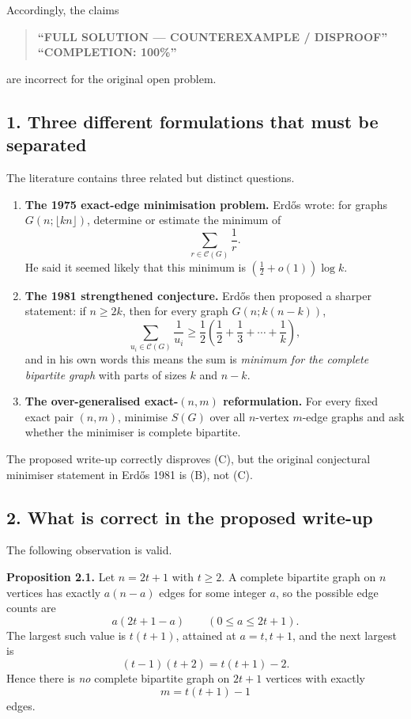 Accordingly, the claims
\begin{quote}
\textbf{``FULL SOLUTION --- COUNTEREXAMPLE / DISPROOF''}
\qquad{}\qquad
\textbf{``COMPLETION: 100\%''}
\end{quote}
are incorrect for the original open problem.

\subsection*{1. Three different formulations that must be separated}

The literature contains three related but distinct questions.

\begin{enumerate}
\item[(A)] \textbf{The 1975 exact-edge minimisation problem.}
Erd\H{o}s wrote: for graphs $G(n;\lfloor kn\rfloor)$, determine or estimate the minimum of
\[
\sum_{r\in \mathcal C(G)} \frac1r.
\]
He said it seemed likely that this minimum is $(\tfrac12+o(1))\log k$.

\item[(B)] \textbf{The 1981 strengthened conjecture.}
Erd\H{o}s then proposed a sharper statement: if $n\ge 2k$, then for every graph $G(n;k(n-k))$,
\[
\sum_{u_i\in \mathcal C(G)} \frac1{u_i}
\ge \frac12\left(\frac12+\frac13+\cdots+\frac1k\right),
\]
and in his own words this means the sum is \emph{minimum for the complete bipartite graph} with parts of sizes $k$ and $n-k$.

\item[(C)] \textbf{The over-generalised exact-$(n,m)$ reformulation.}
For every fixed exact pair $(n,m)$, minimise $S(G)$ over all $n$-vertex $m$-edge graphs and ask whether the minimiser is complete bipartite.
\end{enumerate}

The proposed write-up correctly disproves (C), but the original conjectural minimiser statement in Erd\H{o}s 1981 is (B), not (C).

\subsection*{2. What is correct in the proposed write-up}

The following observation is valid.

\textbf{Proposition 2.1.}
Let $n=2t+1$ with $t\ge 2$. A complete bipartite graph on $n$ vertices has exactly $a(n-a)$ edges for some integer $a$, so the possible edge counts are
\[
a(2t+1-a)\qquad(0\le a\le 2t+1).
\]
The largest such value is $t(t+1)$, attained at $a=t,t+1$, and the next largest is
\[
(t-1)(t+2)=t(t+1)-2.
\]
Hence there is \emph{no} complete bipartite graph on $2t+1$ vertices with exactly
\[
m=t(t+1)-1
\]
edges.

